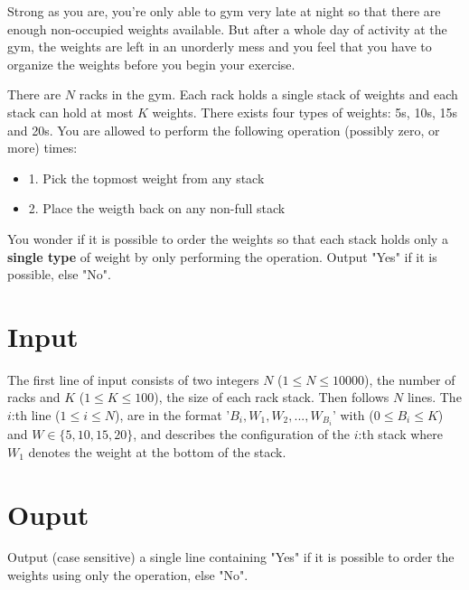 Strong as you are, you're only able to gym very late at night so that there are enough non-occupied weights available. 
But after a whole day of activity at the gym, the weights are left in an unorderly mess and you feel that you have to organize the weights before you begin your exercise.

There are $N$ racks in the gym. Each rack holds a single stack of weights and each stack can hold at most $K$ weights. 
There exists four types of weights: 5s, 10s, 15s and 20s. You are allowed to perform the following operation (possibly zero, or more) times:

\begin{itemize}
    \item{1. Pick the topmost weight from any stack}
    \item{2. Place the weigth back on any non-full stack}
\end{itemize}


You wonder if it is possible to order the weights so that each stack holds only a \textbf{single type} of weight by only performing the operation. Output "Yes" if it is possible, else "No".

\section*{Input}
The first line of input consists of two integers $N$ ($1 \leq N \leq 10000$), the number of racks and $K$ ($1 \leq K \leq 100$), the size of each rack stack. Then follows $N$ lines. The $i$:th line ($1 \leq i \leq N$), are in the format '$B_i, W_1, W_2, ..., W_{B_i}$' with ($0 \leq B_i \leq K$) and $W \in \{5,10,15,20\}$, and describes the configuration of the $i$:th stack where $W_1$ denotes the weight at the bottom of the stack.
\section*{Ouput}
Output (case sensitive) a single line containing "Yes" if it is possible to order the weights using only the operation, else "No".